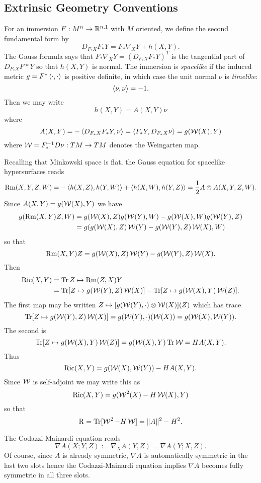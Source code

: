 \documentclass[a4paper, 12pt]{amsart}
\begin{document}
\subsection{Extrinsic Geometry Conventions}
\label{subsec:notation_extrinsic}

For an immersion \(F : M^n \to \R^{n,1}\) with \(M\) oriented, we define the second fundamental form by
\[
D_{F_{\ast} X} F_{\ast} Y = F_{\ast} \nabla_X Y + h(X, Y).
\]
The Gauss formula says that \(F_{\ast} \nabla_X Y = (D_{F_{\ast} X} F_{\ast} Y)^T\) is the tangential part of \(D_{F_{\ast} X} F{\ast} Y\) so that \(h(X, Y)\) is normal. The immersion is \emph{spacelike} if the induced metric \(g = F^{\ast} \inpr{\cdot}{\cdot}\) is positive definite, in which case the unit normal \(\nu\) is \emph{timelike}:
\[
\inpr{\nu}{\nu} = -1.
\]
Then we may write
\[
h(X, Y) = A(X, Y) \nu
\]
where
\[
A(X, Y) = -\inpr{D_{F_{\ast} X} F_{\ast} Y}{\nu} = \inpr{F_{\ast} Y}{D_{F_{\ast} X} \nu} = g(\W(X), Y)
\]
where \(\W = F_{\ast}^{-1} D\nu: TM \to TM\) denotes the Weingarten map.

Recalling that Minkowski space is flat, the Gauss equation for spacelike hypersurfaces reads
\[
\Rm(X, Y, Z, W) = -\inpr{h(X, Z)}{h(Y, W)} + \inpr{h(X, W)}{h(Y, Z)} = \frac{1}{2} A \owedge A (X, Y, Z, W).
\]
Since \(A(X, Y) = g(\W(X), Y)\) we have
\begin{align*}
g(\Rm(X, Y) Z, W) &= g(\W(X), Z) g(\W(Y), W) - g(\W(X), W) g(\W(Y), Z) \\
&= g(g(\W(X), Z) \W(Y) - g(\W(Y), Z) \W(X), W)
\end{align*}
so that
\[
\Rm(X, Y) Z = g(\W(X), Z) \W(Y) - g(\W(Y), Z) \W(X).
\]
Then
\[
\begin{split}
\Ric(X, Y) &= \Tr Z \mapsto \Rm(Z, X) Y \\
&= \Tr [Z \mapsto g(\W(Y), Z) \W(X)] - \Tr[Z \mapsto g(\W(X), Y) \W(Z)].
\end{split}
\]
The first map may be written \(Z \mapsto [g(\W(Y), \cdot) \otimes \W(X)] (Z)\) which has trace
\[
\Tr [Z \mapsto g(\W(Y), Z) \W(X)] = g(\W(Y), \cdot) (\W(X)) = g(\W(X), \W(Y)).
\]
The second is
\[
\Tr [Z \mapsto g(\W(X), Y) \W(Z)] = g(\W(X), Y) \Tr \W = H A(X, Y).
\]
Thus
\[
\Ric(X, Y) = g(\W(X),\W(Y)) - H A(X, Y).
\]
Since \(\W\) is self-adjoint we may write this as
\[
\Ric(X, Y) = g(\W^2(X) - H \W(X), Y)
\]
so that
\[
\Sc = \Tr [\W^2 - H\W] = \|A\|^2 - H^2.
\]

The Codazzi-Mainardi equation reads
\[
\nabla A (X; Y, Z) := \nabla_X A (Y, Z) = \nabla A(Y; X, Z).
\]
Of course, since \(A\) is already symmetric, \(\nabla A\) is automatically symmetric in the last two slots hence the Codazzi-Mainardi equation implies \(\nabla A\) becomes fully symmetric in all three slots.
\end{document}
